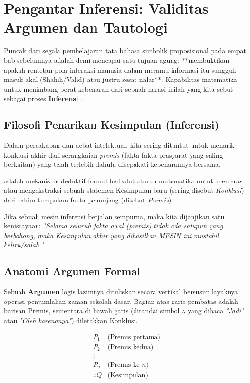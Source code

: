 \section{Pengantar Inferensi: Validitas Argumen dan Tautologi}

Puncak dari segala pembelajaran tata bahasa simbolik proposisional pada empat bab sebelumnya adalah demi mencapai satu tujuan agung: **membuktikan apakah rentetan pola interaksi manusia dalam meramu informasi itu sungguh masuk akal (Shahih/Valid) atau justru sesat nalar**. Kapabilitas matematika untuk menimbang berat kebenaran dari sebuah narasi inilah yang kita sebut sebagai proses \textbf{Inferensi} \cite{rosen2019}.

\subsection{Filosofi Penarikan Kesimpulan (Inferensi)}

Dalam percakapan dan debat intelektual, kita sering dituntut untuk menarik konklusi akhir dari serangkaian \textit{premis} (fakta-fakta prasyarat yang saling berkaitan) yang telah terlebih dahulu disepakati kebenarannya bersama.

\begin{definisi}
 adalah mekanisme deduktif formal berbalut aturan matematika untuk memeras atau mengekstraksi sebuah statemen Kesimpulan baru (sering disebut \textit{Konklusi}) dari rahim tumpukan fakta penunjang (disebut \textit{Premis}).
\end{definisi}

Jika sebuah mesin inferensi berjalan sempurna, maka kita dijanjikan satu keniscayaan: \textit{"Selama seluruh fakta awal (premis) tidak ada satupun yang berbohong, maka Kesimpulan akhir yang dihasilkan MESIN ini mustahil keliru/salah."}

\subsection{Anatomi Argumen Formal}

Sebuah \textbf{Argumen} logis lazimnya dituliskan secara vertikal bersusun layaknya operasi penjumlahan zaman sekolah dasar. Bagian atas garis pembatas adalah barisan Premis, sementara di bawah garis (ditandai simbol $\therefore$ yang dibaca \textit{"Jadi"} atau \textit{"Oleh karenanya"}) diletakkan Konklusi.

\[
\begin{array}{ll}
P_1 & \text{(Premis pertama)} \\
P_2 & \text{(Premis kedua)} \\
\vdots & \\
P_n & \text{(Premis ke-} n) \\
\hline
\therefore Q & \text{(Kesimpulan)}
\end{array}
\]

